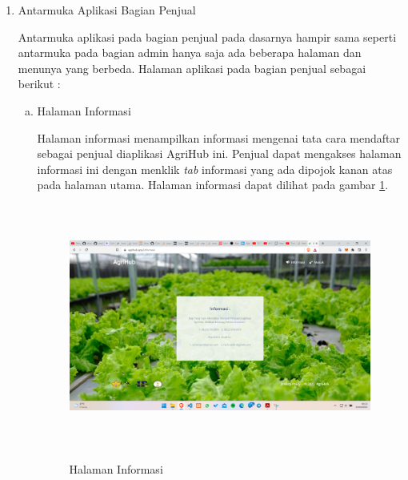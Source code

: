 \begin{enumerate}
	\newpage
	\item Antarmuka Aplikasi Bagian Penjual
	\par Antarmuka aplikasi pada bagian penjual pada dasarnya hampir sama seperti antarmuka pada bagian admin hanya saja ada beberapa halaman dan menunya yang berbeda. Halaman aplikasi pada bagian penjual sebagai berikut :

	\begin{enumerate}[a.]
		\item Halaman Informasi
		\par Halaman informasi menampilkan informasi mengenai tata cara mendaftar sebagai penjual diaplikasi AgriHub ini. Penjual dapat mengakses halaman informasi ini dengan menklik \textit{tab} informasi yang ada dipojok kanan atas pada halaman utama. Halaman informasi dapat dilihat pada gambar \ref*{informasi}.
		\begin{figure}[H]
			\centering
			{\includegraphics [width = 13.3cm, height= 8cm]{gambar/informasi}}
			\caption{Halaman Informasi}
			\label{informasi}
		\end{figure}


\end{enumerate}
\end{enumerate}
